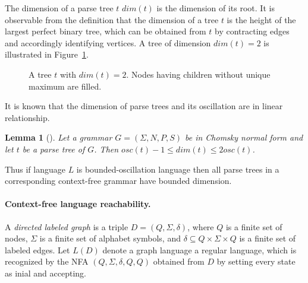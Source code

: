 \documentclass[11pt,a4paper]{article} %
\newtheorem{lemma}{Lemma}
\begin{document}
The dimension of a parse tree $t$ $dim(t)$ is the dimension of its root. 
It is observable from the definition that the dimension of a tree $t$
is the height of the largest perfect binary tree,
which can be obtained from $t$ by contracting edges and accordingly identifying vertices.
A tree of dimension $dim(t) = 2$ is illustrated in Figure~\ref{oscbtree}.
\begin{figure}
\centering
{}
\caption{A tree $t$ with $dim(t)=2$. Nodes having children without unique maximum are filled.}
\label{oscbtree}            
\end{figure}


It is known that the dimension of parse trees and its oscillation are in linear relationship.

\begin{lemma}[\cite{BoundOsc}]
\label{boscdim}
Let a grammar $G = (\Sigma, N, P, S)$ be in Chomsky normal form and let $t$ be a parse tree of $G$. Then $osc(t) - 1 \le dim(t) \le 2osc(t)$.
\end{lemma}
Thus if language $L$ is bounded-oscillation language then all parse trees in a corresponding context-free grammar have bounded dimension.
\paragraph{Context-free language reachability.} 
A \textit{directed labeled graph} is a triple $D = (Q, \Sigma, \delta)$, where $Q$ is a finite set of nodes, $\Sigma$ is a finite set of alphabet symbols,
and $\delta \subseteq Q \times \Sigma \times Q$ is a finite set of labeled edges. Let $L(D)$ denote a graph language a regular language, which is recognized by the NFA $(Q,\Sigma ,\delta ,Q, Q)$ obtained from $D$ by setting every state as inial and accepting.
\end{document}
